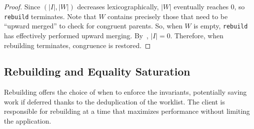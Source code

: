 \begin{proof}
  Since $(|I|, |W|)$ decreases lexicographically,
    $|W|$ eventually reaches $0$, so \texttt{rebuild} terminates.
  Note that $W$ contains precisely those \eclasses that need to be
    ``upward merged'' to check for congruent parents.
  So, when $W$ is empty,
    \texttt{rebuild} has effectively performed upward merging.
  By~\citet[Chapter 7]{nelson}, $|I| = 0$.
Therefore, when rebuilding terminates, congruence is restored.

\end{proof}

\subsection{Rebuilding and Equality Saturation}
\label{sec:rebuilding-eqsat}

Rebuilding offers the choice of when to enforce the \egraph invariants,
  potentially saving work if deferred thanks to the deduplication of the
  worklist.
The client is responsible for rebuilding at a time that
  maximizes performance without limiting the application.

